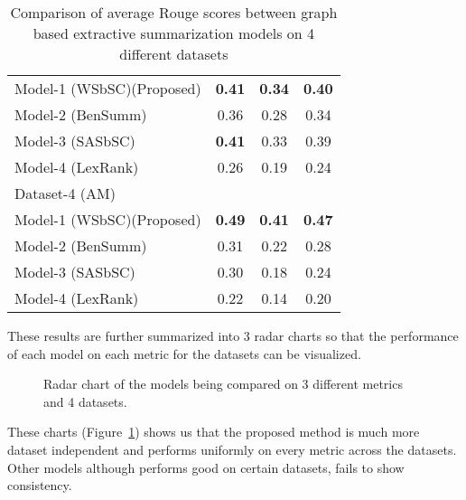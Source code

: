 \begin{table}[]
\begin{tabular}{lccc}
         Model-1 (WSbSC)(Proposed)                                      & \textbf{0.41} & \textbf{0.34} & \textbf{0.40} \\
         Model-2 (BenSumm)~\cite{chowdhury-etal-2021-tfidf-clustering}  & 0.36          & 0.28          & 0.34          \\
         Model-3 (SASbSC)~\cite{roychowdhury-etal-2022-spectral-base}   & \textbf{0.41} & 0.33          & 0.39          \\
         Model-4 (LexRank)~\cite{Erkan-lexRank-2004}                          & 0.26          & 0.19          & 0.24          \\\hline
         Dataset-4 (AM)                                                 &               &               &               \\\hline
         Model-1 (WSbSC)(Proposed)                                      & \textbf{0.49} & \textbf{0.41} & \textbf{0.47} \\
         Model-2 (BenSumm)~\cite{chowdhury-etal-2021-tfidf-clustering}  & 0.31          & 0.22          & 0.28          \\
         Model-3 (SASbSC)~\cite{roychowdhury-etal-2022-spectral-base}   & 0.30          & 0.18          & 0.24          \\
         Model-4 (LexRank)~\cite{Erkan-lexRank-2004}                          & 0.22          & 0.14          & 0.20          \\
    \end{tabular}
    \caption{Comparison of average Rouge scores between graph based extractive summarization models on 4 different datasets}
    \label{tab:result_comparison-1}
\end{table}

These results are further summarized into 3 radar charts so that the performance of each model on each
metric for the datasets can be visualized.

\begin{figure}
    \centering
    
    \caption{Radar chart of the models being compared on 3 different metrics and 4 datasets.}
    \label{fig:radarchart}
 \end{figure}

These charts (Figure~\ref{fig:radarchart}) shows us that the proposed method is much more dataset independent and performs
uniformly on every metric across the datasets.
Other models although performs good on certain datasets, fails to show consistency.


